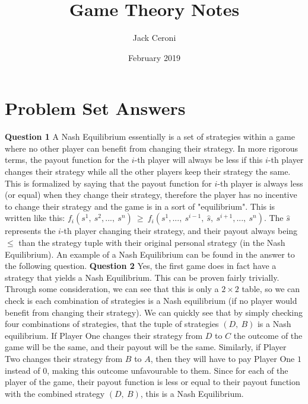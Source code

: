 \documentclass{article}
\title{Game Theory Notes}
\author{Jack Ceroni}
\date{February 2019}
\begin{document}
\maketitle
\newpage
\section{Problem Set Answers}
\vspace{5mm}
\textbf{Question 1}
\newline\newline
A Nash Equilibrium essentially is a set of strategies within a game where no other player can benefit from changing their strategy. In more rigorous terms, the payout function for the $i$-th player will always be less if this $i$-th  player changes their strategy while all the other players keep their strategy the same.  This is formalized by saying that the payout function for $i$-th player is always less (or equal) when they change their strategy, therefore the player has no incentive to change their strategy and the game is in a sort of "equilibrium". This is written like this: $f_i(s^1, \ s^2, ..., \ s^n) \ \geq \ f_i(s^1, ..., \ s^{i-1}, \ \hat{s}, \ s^{i+1}, ..., \ s^n)$. The $\hat{s}$ represents the $i$-th player changing their strategy, and their payout always being $\leq$ than the strategy tuple with their original personal strategy (in the Nash Equilibrium).
\newline\newline
An example of a Nash Equilibrium can be found in the answer to the following question.
\newline\newline
\textbf{Question 2}
\newline\newline
Yes, the first game does in fact have a strategy that yields a Nash Equilibrium. This can be proven fairly trivially. Through some consideration, we can see that this is only a $2\times2$ table, so we can check is each combination of strategies is a Nash equilibrium (if no player would benefit from changing their strategy). We can quickly see that by simply checking four combinations of strategies, that the tuple of strategies $(D, \ B)$ is a Nash equilibrium. If Player One changes their strategy from $D$ to $C$ the outcome of the game will be the same, and their payout will be the same. Similarly, if Player Two changes their strategy from $B$ to $A$, then they will have to pay Player One $1$ instead of $0$, making this outcome unfavourable to them. Since for each of the player of the game, their payout function is less or equal to their payout function with the combined strategy $(D, \ B)$, this is a Nash Equilibrium.
\end{document}

